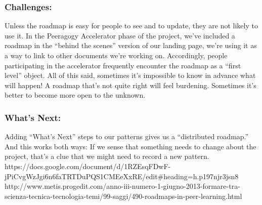 \subsubsection*{Challenges:} Unless the roadmap is easy for people to see and to
update, they are not likely to use it. In the Peeragogy Accelerator
phase of the project, we've included a roadmap in the ``behind the
scenes'' version of our landing page, we're using it as a way to link to
other documents we're working on. Accordingly, people participating in
the accelerator frequently encounter the roadmap as a ``first level''
object. All of this said, sometimes it's impossible to know in advance
what will happen! A roadmap that's not quite right will feel burdening.
Sometimes it's better to become more open to the unknown.

\subsubsection*{What's Next:} 
Adding ``What's Next'' steps to our patterns gives us a ``distributed
roadmap.''  And this works both ways: If we sense that something needs
to change about the project, that's a clue that we might need to
record a new pattern. https://docs.google.com/document/d/1RZEsqFDwF-jPiCvgWzJgi6n6faTRTDuPQS1CMEeXxRE/edit\#heading=h.p197njr3jsn8 http://www.metis.progedit.com/anno-iii-numero-1-giugno-2013-formare-tra-scienza-tecnica-tecnologia-temi/99-saggi/490-roadmaps-in-peer-learning.html
